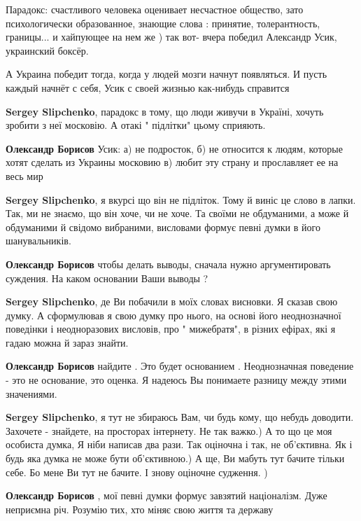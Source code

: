 \begin{itemize}
Парадокс: счастливого человека оценивает несчастное общество, зато
психологически образованное, знающие слова : принятие, толерантность, границы...
и хайпующее на нем же ) так вот- вчера победил Александр Усик, украинский
боксёр. 

А Украина победит тогда, когда у людей мозги начнут появляться. И пусть каждый
начнёт с себя, Усик с своей жизнью как-нибудь справится

\begin{itemize} %
\textbf{Sergey Slipchenko}, парадокс в тому, що люди живучи в Україні, хочуть зробити з неї московію. А отакі " підлітки" цьому сприяють.

\textbf{Олександр Борисов} Усик: а) не подросток, б) не относится к людям, которые хотят сделать из Украины московию в) любит эту страну и прославляет ее на весь мир

\textbf{Sergey Slipchenko}, я вкурсі що він не підліток. Тому й виніс це слово в лапки.
Так, ми не знаємо, що він хоче, чи не хоче. Та своїми не обдуманими, а може й обдуманими й свідомо вибраними, висловами формує певні думки в його шанувальників.

\textbf{Олександр Борисов} чтобы делать выводы, сначала нужно аргументировать суждения. На каком основании Ваши выводы ?

\textbf{Sergey Slipchenko}, де Ви побачили в моїх словах висновки. Я сказав свою думку. А сформулював я свою думку про нього, на основі його неоднозначної поведінки і неодноразових висловів, про " мижебратя", в різних ефірах, які я гадаю можна й зараз знайти.

\textbf{Олександр Борисов} найдите . Это будет основанием . Неоднозначная поведение - это не основание, это оценка. Я надеюсь Вы понимаете разницу между этими значениями.

\textbf{Sergey Slipchenko}, я тут не збираюсь Вам, чи будь кому, що небудь доводити. Захочете - знайдете, на просторах інтернету. Не так важко.)
А то що це моя особиста думка, Я ніби написав два рази.
Так оціночна і так, не об'єктивна. Як і будь яка думка не може бути об'єктивною.)
А ще, Ви мабуть тут бачите тільки себе. Бо мене Ви тут не бачите. І знову оціночне судження. )

\textbf{Олександр Борисов} , мої певні думки формує завзятий націоналізм. Дуже неприємна річ. Розумію тих, хто міняє свою життя та державу


\end{itemize}
\end{itemize}
